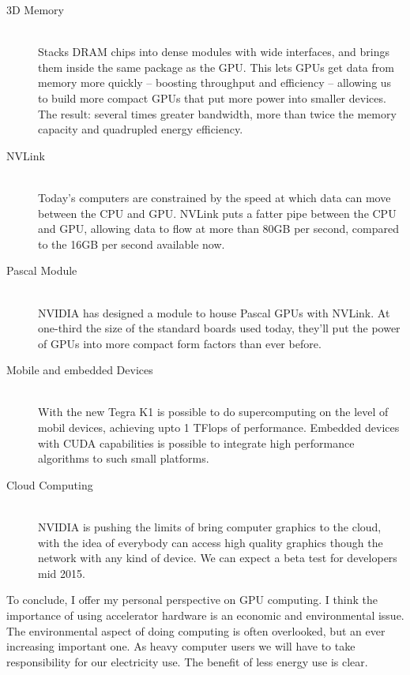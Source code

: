 \begin{description}
  \item[3D Memory] \hfill \\
 Stacks DRAM chips into dense modules with wide interfaces, and brings them inside the same package as the GPU. This lets GPUs get data from memory more quickly – boosting throughput and efficiency – allowing us to build more compact GPUs that put more power into smaller devices. The result: several times greater bandwidth, more than twice the memory capacity and quadrupled energy efficiency.
  
  \item[NVLink] \hfill \\
 Today’s computers are constrained by the speed at which data can move between the CPU and GPU. NVLink puts a fatter pipe between the CPU and GPU, allowing data to flow at more than 80GB per second, compared to the 16GB per second available now.
 
 \item[Pascal Module] \hfill \\ 
  NVIDIA has designed a module to house Pascal GPUs with NVLink. At one-third the size of the standard boards used today, they’ll put the power of GPUs into more compact form factors than ever before.
  
   \item[Mobile and embedded Devices] \hfill \\ 
   With the new Tegra K1 is possible to do supercomputing on the level of mobil devices, achieving upto 1 TFlops of performance. Embedded devices with CUDA capabilities is possible to integrate high performance algorithms to such small platforms. 
   \item[Cloud Computing] \hfill \\ 
   NVIDIA is pushing the limits of bring computer graphics to the cloud, with the idea of everybody can access high quality graphics though the network with any kind of device. We can expect a beta test for developers mid 2015.
 
  \end{description}

To conclude, I offer my personal perspective on GPU computing. I think the importance of using accelerator hardware is an economic and environmental issue. The environmental aspect of doing computing is often overlooked, but an ever increasing important one. As heavy computer users we will have to take responsibility for our electricity use. The benefit of less energy use is clear.